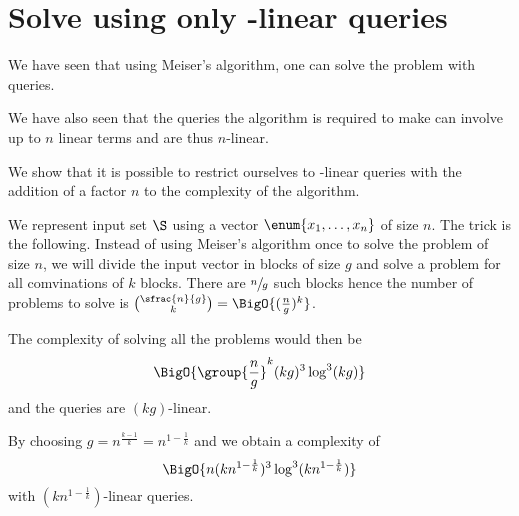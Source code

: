 \section{Solve \kSUM using only -linear queries}

We have seen that using Meiser's algorithm, one can solve the \kSUM problem
with  queries.

We have also seen that the queries the algorithm is required to make can
involve up to \(n\) linear terms and are thus \(n\)-linear.

We show that it is possible to restrict ourselves to -linear queries
with the addition of a factor \(n\) to the complexity of the algorithm.

We represent input set \(\S\) using a vector \(\enum{x_1,\ldots,x_n}\) of size
\(n\). The trick is the following. Instead of using Meiser's algorithm once
to solve the problem of size \(n\), we will divide the input vector in blocks
of size \(g\) and solve a \kSUM problem for all comvinations of \(k\) blocks.
There are \(\sfrac{n}{g}\) such blocks hence the number of problems to solve is
\(\binom{\sfrac{n}{g}}{k} = \BigO{(\frac{n}{g})^k} \).

The complexity of solving all the problems would then be
\begin{displaymath}
\BigO{\group{\frac{n}{g}}^k (kg)^3 \log^3 (kg) }
\end{displaymath}
and the queries are \((kg)\)-linear.

By choosing \(g = n^{\frac{k-1}{k}} = n^{1-\frac{1}{k}}\) and we obtain a
complexity of
\begin{displaymath}
\BigO{n (kn^{1-\frac{1}{k}})^3 \log^3 (kn^{1-\frac{1}{k}}) }
\end{displaymath}
with \((kn^{1-\frac{1}{k}})\)-linear queries.

